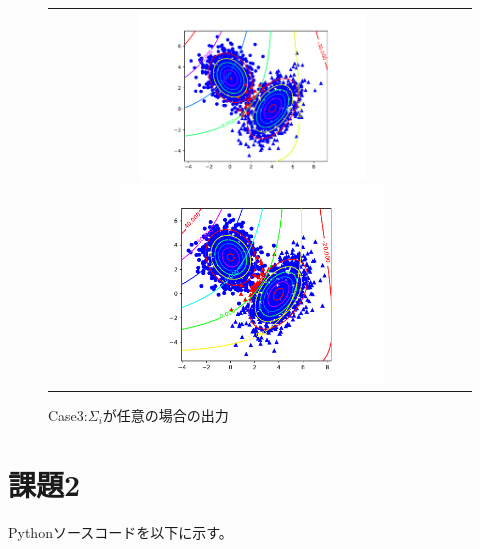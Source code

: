 \documentclass[uplatex,a4paper]{jsarticle}
\begin{document}
\begin{figure}[H]
\begin{center}
\begin{tabular}{ccc}
\end{tabular}
\begin{tabular}{cc}
\begin{minipage}{0.33\hsize}
\includegraphics[width=6cm]{Model3_70.pdf}
\end{minipage}
\begin{minipage}{0.33\hsize}
\includegraphics[width=7cm]{Model3_90.pdf}
\end{minipage}
\end{tabular}
\caption{Case3:$\Sigma_i$が任意の場合の出力}
\label{fig:ass1_case3}
\end{center}
\end{figure}
\section*{課題2}
Pythonソースコードを以下に示す。
\inputminted[linenos=true,breaklines=true,bgcolor=bg,fontsize=\footnotesize]{python}{assignment2.py}
\end{document}
